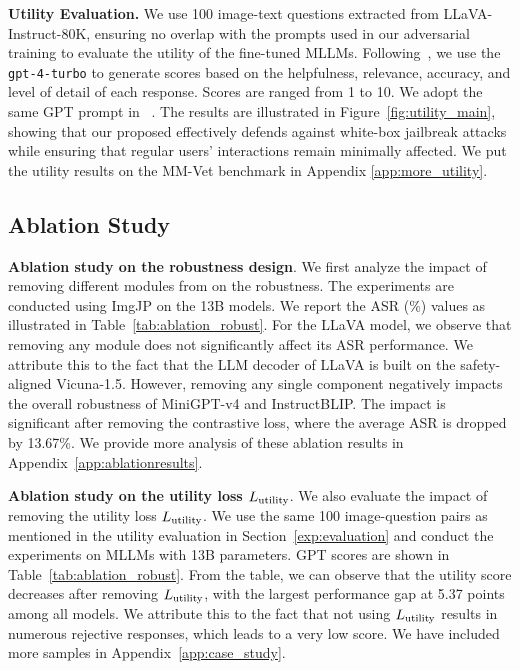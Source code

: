 \textbf{Utility Evaluation.}
We use 100 image-text questions extracted from LLaVA-Instruct-80K, ensuring no overlap with the prompts used in our adversarial training to evaluate the utility of the fine-tuned MLLMs.
Following~\citep{liu2024visual}, we use the \texttt{gpt-4-turbo} to generate scores based on the helpfulness, relevance, accuracy, and level of detail of each response. Scores are ranged from 1 to 10. We adopt the same GPT prompt in ~\citep{liu2024visual}.
The results are illustrated in Figure~\ref{fig:utility_main}, showing that our proposed {\name} effectively defends against white-box jailbreak attacks while ensuring that regular users' interactions remain minimally affected. We put the utility results on the MM-Vet benchmark in Appendix \textcolor{red}{\ref{app:more_utility}}.

\subsection{Ablation Study}\label{sec:ablation}

\textbf{Ablation study on the robustness design}.
We first analyze the impact of removing different modules from {\name} on the robustness. The experiments are conducted using ImgJP on the 13B models. We report the ASR (\%) values as illustrated in Table~\ref{tab:ablation_robust}. For the LLaVA model, we observe that removing any module does not significantly affect its ASR performance. We attribute this to the fact that the LLM decoder of LLaVA is built on the safety-aligned Vicuna-1.5. 
However, removing any single component negatively impacts the overall robustness of MiniGPT-v4 and InstructBLIP. The impact is significant after removing the contrastive loss, where the average ASR is dropped by 13.67\%. We provide more analysis of these ablation results in Appendix~\ref{app:ablationresults}.


\textbf{Ablation study on the utility loss $L_{\rm utility}$}. We also evaluate the impact of removing the utility loss $L_{\rm utility}$. We use the same 100 image-question pairs as mentioned in the utility evaluation in Section~\ref{exp:evaluation} and conduct the experiments on MLLMs with 13B parameters. GPT scores are shown in Table~\ref{tab:ablation_robust}. From the table, we can observe that the utility score decreases after removing $L_{\rm utility}$, with the largest performance gap at 5.37 points among all models. We attribute this to the fact that not using $L_{\rm utility}$ results in numerous rejective responses, which leads to a very low score. We have included more samples in Appendix~\textcolor{red}{\ref{app:case_study}}. 

